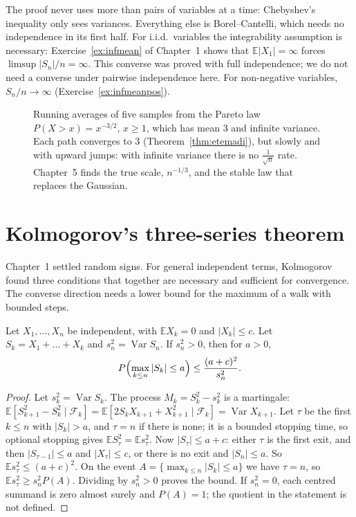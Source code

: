 The proof never uses more than pairs of variables at a time: Chebyshev's inequality only sees variances. Everything else is Borel--Cantelli,
which needs no independence in its first half. For i.i.d.\ variables the integrability assumption is necessary: Exercise~\ref{ex:infmean} of Chapter~1 shows that $\mathbb E|X_1|=\infty$ forces $\limsup|S_n|/n=\infty$. This converse was proved with full independence; we do not need a converse under pairwise independence here. For non-negative variables, $S_n/n\to\infty$ (Exercise~\ref{ex:infmeanpos}).

\begin{figure}[ht]
\centering{}
\caption{Running averages of five samples from the Pareto law $P(X>x)=x^{-3/2}$, $x\ge1$, which has mean $3$ and infinite variance. Each path
converges to $3$ (Theorem~\ref{thm:etemadi}), but slowly and with upward jumps: with infinite variance there is no $\frac1{\sqrt n}$ rate.
Chapter~5 finds the true scale, $n^{-1/3}$, and the stable law that replaces the Gaussian.}
\label{fig:pareto}
\end{figure}

\section{Kolmogorov's three-series theorem}\label{sec:threeseries}

Chapter~1 settled random signs. For general independent terms, Kolmogorov found three conditions that together are necessary and sufficient
for convergence. The converse direction needs a lower bound for the maximum of a walk with bounded steps.

\begin{lemma}\label{lem:kolmogorovlower}
Let $X_1,\dots,X_n$ be independent, with $\mathbb E X_k=0$ and $|X_k|\le c$. Let $S_k=X_1+\dots+X_k$ and $s_n^2=\operatorname{Var}S_n$. If $s_n^2>0$, then for $a>0$,
\[
P\Bigl(\max_{k\le n}|S_k|\le a\Bigr)\le\frac{(a+c)^2}{s_n^2}.
\]
\end{lemma}
\begin{proof}
Let $s_k^2=\operatorname{Var}S_k$. The process $M_k=S_k^2-s_k^2$ is a martingale: $\mathbb E[S_{k+1}^2-S_k^2\mid\mathcal F_k]=\mathbb E[2S_kX_{k+1}+X_{k+1}^2
\mid\mathcal F_k]=\operatorname{Var}X_{k+1}$. Let $\tau$ be the first $k\le n$ with $|S_k|>a$, and $\tau=n$ if there is none; it is a bounded
stopping time, so optional stopping gives $\mathbb E S_\tau^2=\mathbb E s_\tau^2$. Now $|S_\tau|\le a+c$: either $\tau$ is the first exit, and then
$|S_{\tau-1}|\le a$ and $|X_\tau|\le c$, or there is no exit and $|S_n|\le a$. So $\mathbb E s_\tau^2\le(a+c)^2$. On the event
$A=\{\max_{k\le n}|S_k|\le a\}$ we have $\tau=n$, so $\mathbb E s_\tau^2\ge s_n^2P(A)$. Dividing by $s_n^2>0$ proves the bound. If $s_n^2=0$, each centred summand is zero almost surely and $P(A)=1$; the quotient in the statement is not defined.
\end{proof}

